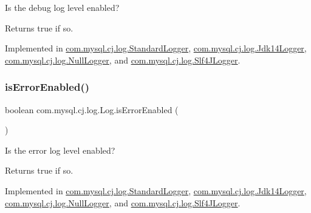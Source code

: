 Is the \textquotesingle{}debug\textquotesingle{} log level enabled?

\begin{DoxyReturn}{Returns}
true if so. 
\end{DoxyReturn}


Implemented in \mbox{\hyperlink{classcom_1_1mysql_1_1cj_1_1log_1_1_standard_logger_ae2a40a552ba3dec4a358cecb436341a3}{com.\+mysql.\+cj.\+log.\+Standard\+Logger}}, \mbox{\hyperlink{classcom_1_1mysql_1_1cj_1_1log_1_1_jdk14_logger_a91af3e97f6fbf354b88532b8aaa50453}{com.\+mysql.\+cj.\+log.\+Jdk14\+Logger}}, \mbox{\hyperlink{classcom_1_1mysql_1_1cj_1_1log_1_1_null_logger_acd9c06dcf57d15d16653d31aca25d885}{com.\+mysql.\+cj.\+log.\+Null\+Logger}}, and \mbox{\hyperlink{classcom_1_1mysql_1_1cj_1_1log_1_1_slf4_j_logger_a2063aafb5440a0a1a8b9038603916773}{com.\+mysql.\+cj.\+log.\+Slf4\+J\+Logger}}.

\mbox{\label{interfacecom_1_1mysql_1_1cj_1_1log_1_1_log_abda4b698026fdb26c74b211b521628c9}} 
\subsubsection{\texorpdfstring{is\+Error\+Enabled()}{isErrorEnabled()}}
{\footnotesize\ttfamily boolean com.\+mysql.\+cj.\+log.\+Log.\+is\+Error\+Enabled (\begin{DoxyParamCaption}{ }\end{DoxyParamCaption})}

Is the \textquotesingle{}error\textquotesingle{} log level enabled?

\begin{DoxyReturn}{Returns}
true if so. 
\end{DoxyReturn}


Implemented in \mbox{\hyperlink{classcom_1_1mysql_1_1cj_1_1log_1_1_standard_logger_ab2e1961de9eba2577b779cb970abc000}{com.\+mysql.\+cj.\+log.\+Standard\+Logger}}, \mbox{\hyperlink{classcom_1_1mysql_1_1cj_1_1log_1_1_jdk14_logger_ae42f076b115e190b2c7bb186493ea171}{com.\+mysql.\+cj.\+log.\+Jdk14\+Logger}}, \mbox{\hyperlink{classcom_1_1mysql_1_1cj_1_1log_1_1_null_logger_af10dc1e8e5216c051f786d1d7578bb07}{com.\+mysql.\+cj.\+log.\+Null\+Logger}}, and \mbox{\hyperlink{classcom_1_1mysql_1_1cj_1_1log_1_1_slf4_j_logger_a3401a68eb92f0e0eec87e8140c36faa7}{com.\+mysql.\+cj.\+log.\+Slf4\+J\+Logger}}.

